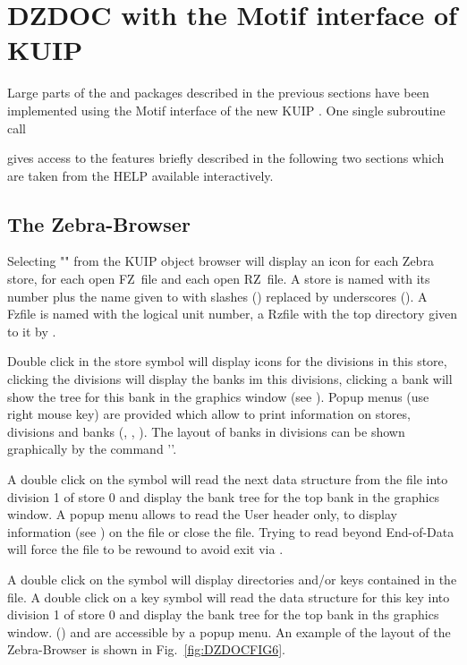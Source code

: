 \section{DZDOC with the Motif interface of KUIP}
Large parts of the  and  packages
described in the previous
sections have been implemented using the Motif 
interface of the new KUIP \cite{bib-KUIP}. One single subroutine call
 
 
gives access to the features briefly described in the following two
sections which are taken from the HELP available interactively.
 
\subsection{The Zebra-Browser}
 
Selecting "" from the KUIP object browser will display
an icon for each Zebra store, for each open FZ~file and each
open RZ~file. A store is named with its number plus the name
given to  with slashes (\Lit{/}) replaced by underscores (\Lit{_}).
A Fzfile is named with the logical unit number, a Rzfile with
the top directory given to it by .
 
Double click in the store symbol will display icons for the
divisions in this store, clicking the divisions will display
the banks im this divisions, clicking a bank will show the
tree for this bank in the graphics window (see ).
Popup menus (use right mouse key) are provided which allow to
print information on stores, divisions and banks (,
, ). The layout of banks in divisions can be
shown graphically by the command ''.
 
A double click on the  symbol will read the next data
structure from the file into division 1 of store 0 and
display the bank tree for the top bank in the graphics
window. A popup menu allows to read the User header only,
to display information (see ) on the file or close the
file. Trying to read beyond End-of-Data will force the
file to be rewound to avoid exit via .
 
A double click on the  symbol will display directories
and/or keys contained in the file. A double click on a key
symbol will read the data structure for this key into
division 1 of store 0 and display the bank tree for the
top bank in ths graphics window.  () and
 are accessible by a popup menu.
An example of the layout of the Zebra-Browser is shown in 
Fig.~\ref{fig:DZDOCFIG6}.
 
